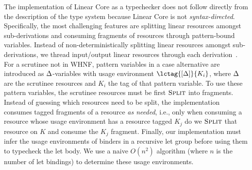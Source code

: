 \documentclass[acmsmall,review,anonymous,screen]{acmart}
\begin{document}

The implementation of Linear Core as a typechecker does not follow
directly from the description of the type system because Linear Core
is not \emph{syntax-directed}. Specifically, the most challenging
features are splitting linear resources amongst sub-derivations and
consuming fragments of resources through pattern-bound variables.
Instead of non-deterministically splitting linear resources amongst
sub-derivations, we thread input/output linear resources through each
derivation~\cite{DBLP:journals/tcs/CervesatoHP00}.
%
For a scrutinee not in WHNF, pattern variables in a case alternative are
introduced as $\Delta$-variables with usage environment $\lctag{\irr{\D}}{K_i}$,
where $\Delta$ are the scrutinee resources and $K_i$ the tag of that pattern
variable. To use these pattern variables, the scrutinee resources must be first
$\textsc{Split}$ into fragments. Instead of guessing which resources need to be split,
the implementation consumes tagged fragments of a resource \emph{as needed},
i.e., only when consuming a resource whose usage environment has a resource
tagged $K_j$ do we $\textsc{Split}$ that resource on $K$ and consume the $K_j$ fragment.
%
Finally, our implementation must infer the usage environments of binders in
a recursive let group before using them to typecheck the let body. We use a
naive $O(n^2)$ algorithm (where $n$ is the number of let bindings) to determine
these usage environments. %
%
%
%
%


\end{document}
